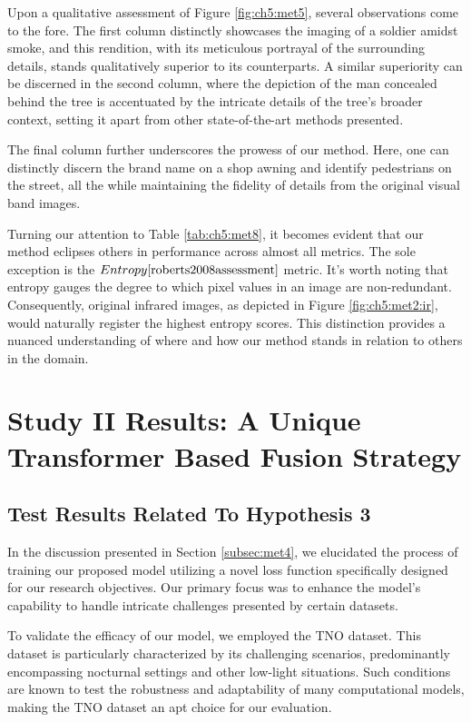 Upon a qualitative assessment of Figure \ref{fig:ch5:met5}, several observations come to the fore. The first column distinctly showcases the imaging of a soldier amidst smoke, and this rendition, with its meticulous portrayal of the surrounding details, stands qualitatively superior to its counterparts. A similar superiority can be discerned in the second column, where the depiction of the man concealed behind the tree is accentuated by the intricate details of the tree's broader context, setting it apart from other state-of-the-art methods presented.

The final column further underscores the prowess of our method. Here, one can distinctly discern the brand name on a shop awning and identify pedestrians on the street, all the while maintaining the fidelity of details from the original visual band images.

Turning our attention to Table \ref{tab:ch5:met8}, it becomes evident that our method eclipses others in performance across almost all metrics. The sole exception is the \(Entropy\cite{roberts2008assessment}\) metric. It's worth noting that entropy gauges the degree to which pixel values in an image are non-redundant. Consequently, original infrared images, as depicted in Figure \ref{fig:ch5:met2:ir}, would naturally register the highest entropy scores. This distinction provides a nuanced understanding of where and how our method stands in relation to others in the domain. 


\section{Study II Results: A Unique Transformer Based Fusion Strategy}\label{sec:study1res}

\subsection{Test Results Related To Hypothesis 3} \label{subsec:met4res}

In the discussion presented in Section \ref{subsec:met4}, we elucidated the process of training our proposed model utilizing a novel loss function specifically designed for our research objectives. Our primary focus was to enhance the model's capability to handle intricate challenges presented by certain datasets.

To validate the efficacy of our model, we employed the TNO dataset. This dataset is particularly characterized by its challenging scenarios, predominantly encompassing nocturnal settings and other low-light situations. Such conditions are known to test the robustness and adaptability of many computational models, making the TNO dataset an apt choice for our evaluation.

